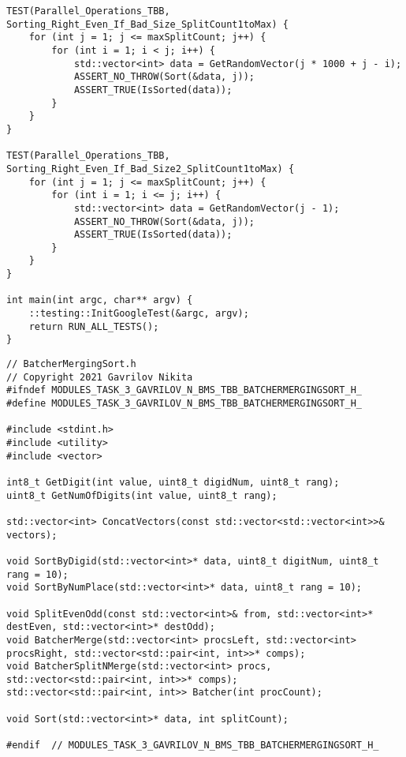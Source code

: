 \documentclass{report}
\begin{document}
\begin{lstlisting}
TEST(Parallel_Operations_TBB, Sorting_Right_Even_If_Bad_Size_SplitCount1toMax) {
    for (int j = 1; j <= maxSplitCount; j++) {
        for (int i = 1; i < j; i++) {
            std::vector<int> data = GetRandomVector(j * 1000 + j - i);
            ASSERT_NO_THROW(Sort(&data, j));
            ASSERT_TRUE(IsSorted(data));
        }
    }
}

TEST(Parallel_Operations_TBB, Sorting_Right_Even_If_Bad_Size2_SplitCount1toMax) {
    for (int j = 1; j <= maxSplitCount; j++) {
        for (int i = 1; i <= j; i++) {
            std::vector<int> data = GetRandomVector(j - 1);
            ASSERT_NO_THROW(Sort(&data, j));
            ASSERT_TRUE(IsSorted(data));
        }
    }
}

int main(int argc, char** argv) {
    ::testing::InitGoogleTest(&argc, argv);
    return RUN_ALL_TESTS();
}
\end{lstlisting}
\begin{lstlisting}
// BatcherMergingSort.h
// Copyright 2021 Gavrilov Nikita
#ifndef MODULES_TASK_3_GAVRILOV_N_BMS_TBB_BATCHERMERGINGSORT_H_
#define MODULES_TASK_3_GAVRILOV_N_BMS_TBB_BATCHERMERGINGSORT_H_

#include <stdint.h>
#include <utility>
#include <vector>

int8_t GetDigit(int value, uint8_t digidNum, uint8_t rang);
uint8_t GetNumOfDigits(int value, uint8_t rang);

std::vector<int> ConcatVectors(const std::vector<std::vector<int>>& vectors);

void SortByDigid(std::vector<int>* data, uint8_t digitNum, uint8_t rang = 10);
void SortByNumPlace(std::vector<int>* data, uint8_t rang = 10);

void SplitEvenOdd(const std::vector<int>& from, std::vector<int>* destEven, std::vector<int>* destOdd);
void BatcherMerge(std::vector<int> procsLeft, std::vector<int> procsRight, std::vector<std::pair<int, int>>* comps);
void BatcherSplitNMerge(std::vector<int> procs, std::vector<std::pair<int, int>>* comps);
std::vector<std::pair<int, int>> Batcher(int procCount);

void Sort(std::vector<int>* data, int splitCount);

#endif  // MODULES_TASK_3_GAVRILOV_N_BMS_TBB_BATCHERMERGINGSORT_H_
\end{lstlisting}
\end{document}
